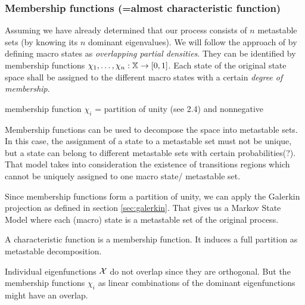 \subsubsection*{Membership functions (=almost characteristic function)}

Assuming we have already determined that our process consists of $n$ metastable sets (by knowing its $n$ dominant eigenvalues).
We will follow the approach of \cite{weber2006meshless} by defining macro states as \textit{overlapping partial densities}. They can be identified by membership functions $\chi_1,\dots,\chi_n : \mathbb{X} \rightarrow [0,1]$. Each state of the original state space shall be assigned to the different macro states with a certain \textit{degree of membership}.

\begin{defi}
membership function $\chi_i$ = partition of unity (see 2.4) and nonnegative
\end{defi}

Membership functions can be used to decompose the space into metastable sets. In this case, the assignment of a state to a metastable set must not be unique, but a state can belong to different metastable sets with certain probabilities(?). That model takes into consideration
the existence of transitions regions which cannot be uniquely assigned to one macro state/ metastable set.


Since membership functions form a partition of unity, we can apply the Galerkin projection as defined in section \ref{sec:galerkin}. That gives us a Markov State Model where each (macro) state is a metastable set of the original process. 

\begin{ex}
A characteristic function is a membership function. It induces a full partition as metastable decomposition.
\end{ex}
Individual eigenfunctions $\mathcal{X}$ do not overlap since they are orthogonal. But the membership functions $\chi_i$ as linear combinations of the dominant eigenfunctions might have an overlap.

